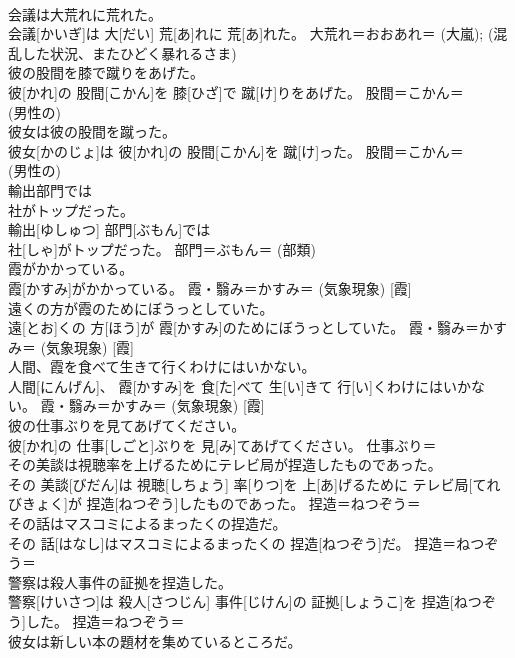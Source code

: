 \documentclass[8pt]{extreport}
\begin{document}
\begin{CJK}{UTF8}{min}
{\\	会議は大荒れに荒れた。	
\\	会議[かいぎ]は 大[だい] 荒[あ]れに 荒[あ]れた。	大荒れ＝おおあれ＝ (大嵐); (混乱した状況、またひどく暴れるさま) 
\\	彼の股間を膝で蹴りをあげた。	
\\	彼[かれ]の 股間[こかん]を 膝[ひざ]で 蹴[け]りをあげた。	股間＝こかん＝ 
\\	(男性の) 
\\	彼女は彼の股間を蹴った。	
\\	彼女[かのじょ]は 彼[かれ]の 股間[こかん]を 蹴[け]った。	股間＝こかん＝ 
\\	(男性の) 
\\	輸出部門では
\\	社がトップだった。	
\\	輸出[ゆしゅつ] 部門[ぶもん]では 
\\	社[しゃ]がトップだった。	部門＝ぶもん＝ (部類) 
\\	霞がかかっている。	
\\	霞[かすみ]がかかっている。	霞・翳み＝かすみ＝ (気象現象) [霞] 
\\	遠くの方が霞のためにぼうっとしていた。	
\\	遠[とお]くの 方[ほう]が 霞[かすみ]のためにぼうっとしていた。	霞・翳み＝かすみ＝ (気象現象) [霞] 
\\	人間、霞を食べて生きて行くわけにはいかない。	
\\	人間[にんげん]、 霞[かすみ]を 食[た]べて 生[い]きて 行[い]くわけにはいかない。	霞・翳み＝かすみ＝ (気象現象) [霞] 
\\	彼の仕事ぶりを見てあげてください。	
\\	彼[かれ]の 仕事[しごと]ぶりを 見[み]てあげてください。	仕事ぶり＝ 
\\	その美談は視聴率を上げるためにテレビ局が捏造したものであった。	
\\	その 美談[びだん]は 視聴[しちょう] 率[りつ]を 上[あ]げるために テレビ局[てれびきょく]が 捏造[ねつぞう]したものであった。	捏造＝ねつぞう＝ 
\\	その話はマスコミによるまったくの捏造だ。	
\\	その 話[はなし]はマスコミによるまったくの 捏造[ねつぞう]だ。	捏造＝ねつぞう＝ 
\\	警察は殺人事件の証拠を捏造した。	
\\	警察[けいさつ]は 殺人[さつじん] 事件[じけん]の 証拠[しょうこ]を 捏造[ねつぞう]した。	捏造＝ねつぞう＝ 
\\	彼女は新しい本の題材を集めているところだ。	
}
\end{CJK}
\end{document}
